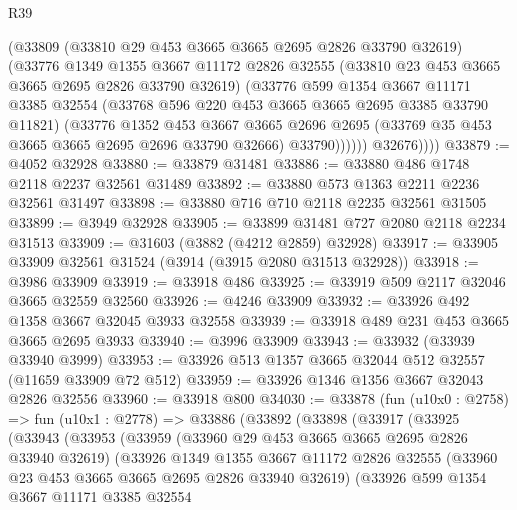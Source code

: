 \begin{lexlean}{R39}
\begin{coremodule}
                (@33809
                  (@33810 @29 @453 @3665 @3665 @2695 @2826 @33790 @32619)
                  (@33776
                    @1349
                    @1355
                    @3667
                    @11172
                    @2826
                    @32555
                    (@33810 @23 @453 @3665 @3665 @2695 @2826 @33790 @32619)
                    (@33776
                      @599
                      @1354
                      @3667
                      @11171
                      @3385
                      @32554
                      (@33768 @596 @220 @453 @3665 @3665 @2695 @3385 @33790 @11821)
                      (@33776
                        @1352
                        @453
                        @3667
                        @3665
                        @2696
                        @2695
                        (@33769 @35 @453 @3665 @3665 @2695 @2696 @33790 @32666)
                        @33790))))))
            @32676))))
@33879 := @4052 @32928
@33880 := @33879 @31481
@33886 := @33880 @486 @1748 @2118 @2237 @32561 @31489
@33892 := @33880 @573 @1363 @2211 @2236 @32561 @31497
@33898 := @33880 @716 @710 @2118 @2235 @32561 @31505
@33899 := @3949 @32928
@33905 := @33899 @31481 @727 @2080 @2118 @2234 @31513
@33909 := @31603 (@3882 (@4212 @2859) @32928)
@33917 := @33905 @33909 @32561 @31524 (@3914 (@3915 @2080 @31513 @32928))
@33918 := @3986 @33909
@33919 := @33918 @486
@33925 := @33919 @509 @2117 @32046 @3665 @32559 @32560
@33926 := @4246 @33909
@33932 := @33926 @492 @1358 @3667 @32045 @3933 @32558
@33939 := @33918 @489 @231 @453 @3665 @3665 @2695 @3933
@33940 := @3996 @33909
@33943 := @33932 (@33939 @33940 @3999)
@33953 := @33926 @513 @1357 @3665 @32044 @512 @32557 (@11659 @33909 @72 @512)
@33959 := @33926 @1346 @1356 @3667 @32043 @2826 @32556
@33960 := @33918 @800
@34030 := @33878
    (fun (u10x0 : @2758) =>
    fun (u10x1 : @2778) =>
    @33886
      (@33892
        (@33898
          (@33917
            (@33925
              (@33943
                (@33953
                  (@33959
                    (@33960 @29 @453 @3665 @3665 @2695 @2826 @33940 @32619)
                    (@33926
                      @1349
                      @1355
                      @3667
                      @11172
                      @2826
                      @32555
                      (@33960 @23 @453 @3665 @3665 @2695 @2826 @33940 @32619)
                      (@33926
                        @599
                        @1354
                        @3667
                        @11171
                        @3385
                        @32554

\end{coremodule}
\end{lexlean}
